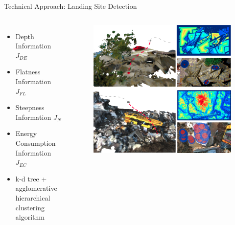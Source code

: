 \documentclass[10pt]{beamer}
\begin{document}

    \begin{frame}{Technical Approach: Landing Site Detection}
        \begin{columns}[c,onlytextwidth]
            \begin{itemize}
                \small
                \item Depth Information $J_{DE}$
                \item Flatness Information $J_{FL}$
                \item Steepness Information $J_{N}$
                \item Energy Consumption Information $J_{EC}$
                \item k-d tree + agglomerative hierarchical clustering algorithm
            \end{itemize}
                \begin{figure}
                    \includegraphics[width=\textwidth]{images/Fig1.png}
                \end{figure}
        \end{columns}
    \end{frame}
\end{document}
